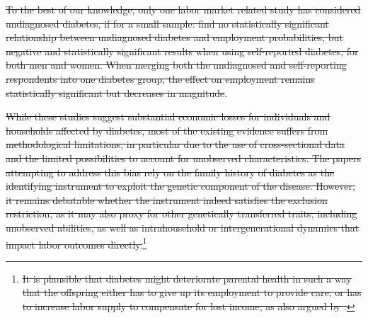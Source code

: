 \documentclass[12pt,english]{article}
\providecommand{\DIFaddtex}[1]{{\protect\color{blue}\uwave{#1}}} %
\providecommand{\DIFdeltex}[1]{{\protect\color{red}\sout{#1}}}                      %
\providecommand{\DIFaddbegin}{} %
\providecommand{\DIFaddend}{} %
\providecommand{\DIFdelbegin}{} %
\providecommand{\DIFdelend}{} %
\providecommand{\DIFadd}[1]{\texorpdfstring{\DIFaddtex{#1}}{#1}} %
\providecommand{\DIFdel}[1]{\texorpdfstring{\DIFdeltex{#1}}{}} %
\begin{document}
\DIFdel{To the best of our knowledge, only one labor market related study has considered undiagnosed diabetes, if for a small sample: \textcite{Minor2015} find no statistically significant relationship between undiagnosed diabetes and employment probabilities, but negative and statistically significant results when using self-reported diabetes, for both men and women. When merging both the undiagnosed and self-reporting respondents into one diabetes group, the effect on employment remains statistically significant but decreases in magnitude}\DIFdelend \DIFaddbegin \DIFadd{diabetes}\DIFaddend .

\DIFdelbegin \DIFdel{While these studies suggest substantial economic losses for individuals and households affected by diabetes, most of the existing evidence suffers from methodological limitations, in particular due to the use of cross-sectional data and the limited possibilities to account for unobserved characteristics. The papers attempting to address this bias rely on the family history of diabetes as the identifying instrument to exploit the genetic component of the disease. However, it remains debatable whether the instrument indeed satisfies the exclusion restriction, as it may also proxy for other genetically transferred traits, including unobserved abilities, as well as  intrahousehold or intergenerational dynamics that impact labor outcomes directly.}\footnote{\DIFdel{It is plausible that diabetes might deteriorate parental health in such a way that the offspring either has to give up its employment to provide care, or has to increase labor supply to compensate for lost income, as also argued by \textcite{Seuring2015}.}} 
\addtocounter{footnote}{-1}%
\end{document}
